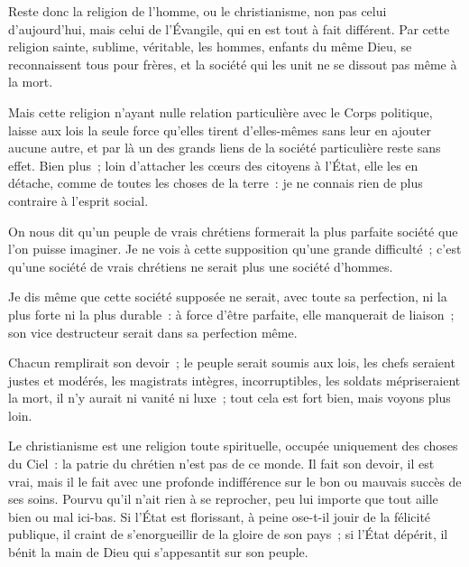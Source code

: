 \documentclass[french,twoside]{book} %
\begin{document}
Reste donc la religion de l’homme, ou le christianisme, non pas celui d’aujourd’hui, mais celui de l’Évangile, qui en est tout à fait différent. Par cette religion sainte, sublime, véritable, les hommes, enfants du même Dieu, se reconnaissent tous pour frères, et la société qui les unit ne se dissout pas même à la mort.\par
Mais cette religion n’ayant nulle relation particulière avec le Corps politique, laisse aux lois la seule force qu’elles tirent d’elles-mêmes sans leur en ajouter aucune autre, et par là un des grands liens de la société particulière reste sans effet. Bien plus ; loin d’attacher les cœurs des citoyens à l’État, elle les en détache, comme de toutes les choses de la terre : je ne connais rien de plus contraire à l’esprit social.\par
On nous dit qu’un peuple de vrais chrétiens formerait la plus parfaite société que l’on puisse imaginer. Je ne vois à cette supposition qu’une grande difficulté ; c’est qu’une société de vrais chrétiens ne serait plus une société d’hommes.\par
Je dis même que cette société supposée ne serait, avec toute sa perfection, ni la plus forte ni la plus durable : à force d’être parfaite, elle manquerait de liaison ; son vice destructeur serait dans sa perfection même.\par
Chacun remplirait son devoir ; le peuple serait soumis aux lois, les chefs seraient justes et modérés, les magistrats intègres, incorruptibles, les soldats mépriseraient la mort, il n’y aurait ni vanité ni luxe ; tout cela est fort bien, mais voyons plus loin.\par
Le christianisme est une religion toute spirituelle, occupée uniquement des choses du Ciel : la patrie du chrétien n’est pas de ce monde. Il fait son devoir, il est vrai, mais il le fait avec une profonde indifférence sur le bon ou mauvais succès de ses soins. Pourvu qu’il n’ait rien à se reprocher, peu lui importe que tout aille bien ou mal ici-bas. Si l’État est florissant, à peine ose-t-il jouir de la félicité publique, il craint de s’enorgueillir de la gloire de son pays ; si l’État dépérit, il bénit la main de Dieu qui s’appesantit sur son peuple.\par
\end{document}
